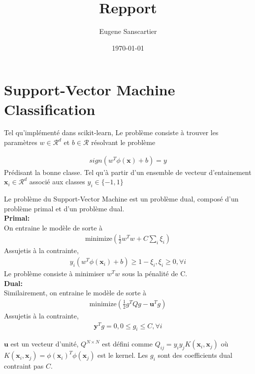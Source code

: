 \documentclass{article}%
\title{Repport}%
\author{Eugene Sanscartier}%
\date{\today}%
\begin{document}
%

\normalsize%
\maketitle%
\section*{Support-Vector Machine Classification}%

Tel qu'implémenté dans scikit-learn, 
Le problème consiste à trouver les paramètres $w \in \mathcal{R}^d$ et $b \in \mathcal{R}$ résolvant le problème

\begin{align*}
    sign \left(w^T \phi(\mathbf{x}) + b \right) = y
\end{align*}
Prédisant la bonne classe. Tel qu'à partir d'un ensemble de vecteur d'entainement $ \mathbf{x}_i \in \mathcal{R}^d$ associé aux classes $y_i \in \{-1, 1\}$

Le problème du Support-Vector Machine est un problème dual, composé d'un problème primal et d'un problème dual.\\
\textbf{Primal:}\\
On entraine le modèle de sorte à 
\begin{align*}
    \text{minimize} \left( \frac{1}{2} w^T w + C \sum_i \xi_i \right)
\end{align*}
Assujetis à la contrainte,
\begin{align*}
    y_i(w^T \phi(\mathbf{x}_i) + b) \geq 1 - \xi_i, \xi_i \geq 0, \forall i
\end{align*}
Le problème consiste à minimiser $w^T w$ sous la pénalité de C.\\
\textbf{Dual:}\\
Similairement, on entraine le modèle de sorte à 
\begin{align*}
    \text{minimize} \left( \frac{1}{2} g^T Q g - \mathbf{u}^T g \right)
\end{align*}
Assujetis à la contrainte,
\begin{align*}
    \mathbf{y}^T g = 0, 0 \leq g_i \leq C, \forall i
\end{align*}

$\mathbf{u}$ est un vecteur d'unité, $Q^{N \times N}$ est défini comme $Q_{ij} = y_i y_j K(\mathbf{x}_i, \mathbf{x}_j)$ où $K(\mathbf{x}_i, \mathbf{x}_j) = \phi (\mathbf{x}_i)^T \phi (\mathbf{x}_j)$ est le kernel. Les $g_i$ sont des coefficients dual contraint pas $C$. \\
\end{document}
